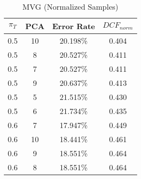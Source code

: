 \begin{longtable}{|c|c|c|c|}
\caption{MVG (Normalized Samples)}\label{tab:mvgn_acctable}\\
\hline
$\pi_T$ & PCA & Error Rate & $DCF_{norm}$\\
\hline
0.5 & 10 & 20.198\% & 0.404\\
\hline
0.5 & 8 & 20.527\% & 0.411\\
\hline
0.5 & 7 & 20.527\% & 0.411\\
\hline
0.5 & 9 & 20.637\% & 0.413\\
\hline
0.5 & 5 & 21.515\% & 0.430\\
\hline
0.5 & 6 & 21.734\% & 0.435\\
\hline
0.6 & 7 & 17.947\% & 0.449\\
\hline
0.6 & 10 & 18.441\% & 0.461\\
\hline
0.6 & 9 & 18.551\% & 0.464\\
\hline
0.6 & 8 & 18.551\% & 0.464\\
\hline
\end{longtable}
